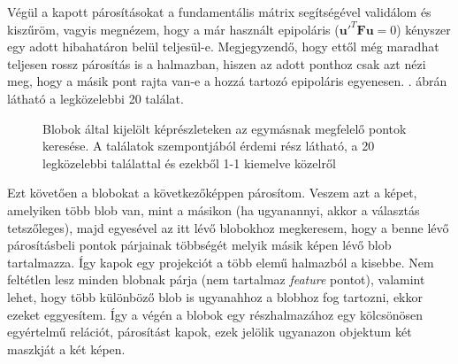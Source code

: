 Végül a kapott párosításokat a fundamentális mátrix segítségével validálom és kiszűröm, vagyis megnézem, hogy a már használt epipoláris ($\mathbf{u}'^T \mathbf{F} \mathbf{u} = 0$) kényszer egy adott hibahatáron belül teljesül-e. Megjegyzendő, hogy ettől még maradhat teljesen rossz párosítás is a halmazban, hiszen az adott ponthoz csak azt nézi meg, hogy a másik pont rajta van-e a hozzá tartozó epipoláris egyenesen. . ábrán látható a legközelebbi 20 találat. 

\begin{figure}[tbh]
\centering


\caption{Blobok által kijelölt képrészleteken az egymásnak megfelelő pontok keresése. A találatok szempontjából érdemi rész látható, a 20 legközelebbi találattal és ezekből 1-1 kiemelve közelről \label{fig:multi-obj-matches}}
\end{figure}

Ezt követően a blobokat a következőképpen párosítom. Veszem azt a képet, amelyiken több blob van, mint a másikon (ha ugyanannyi, akkor a választás tetszőleges), majd egyesével az itt lévő blobokhoz megkeresem, hogy a benne lévő párosításbeli pontok párjainak többségét melyik másik képen lévő blob tartalmazza. Így kapok egy projekciót a több elemű halmazból a kisebbe. Nem feltétlen lesz minden blobnak párja (nem tartalmaz \textit{feature} pontot), valamint lehet, hogy több különböző blob is ugyanahhoz a blobhoz fog tartozni, ekkor ezeket eggyesítem. Így a végén a blobok egy részhalmazához egy kölcsönösen egyértelmű relációt, párosítást kapok, ezek jelölik ugyanazon objektum két maszkját a két képen. %

